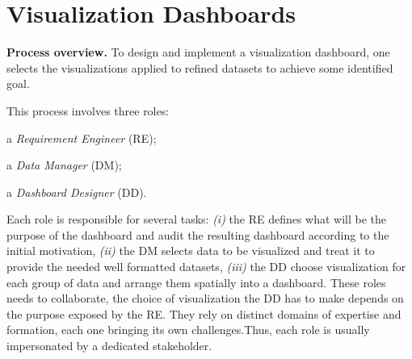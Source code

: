 \documentclass{sigplanconf}
\begin{document}

\section{Visualization Dashboards}
\textbf{Process overview.}
To design and implement a visualization dashboard, one selects the
visualizations applied to refined datasets to achieve some identified
goal. 

This process involves three roles: \begin{myenumerate}
\item a \emph{Requirement Engineer} (RE);
\item a \emph{Data Manager} (DM);
\item a \emph{Dashboard Designer} (DD).
\end{myenumerate}
Each role is responsible for several tasks: \emph{(i)} the RE defines what
will be the purpose of the dashboard and audit the resulting dashboard
according to the initial motivation, \emph{(ii)} the DM selects data to be
visualized and treat it to provide the needed well formatted
datasets, \emph{(iii)} the DD choose visualization for each group of data and
arrange them spatially into a dashboard.
These roles needs to collaborate, \eg the choice of visualization the
DD has to make depends on the purpose exposed by the RE. They rely
on distinct domains of expertise and formation, each one bringing its
own challenges.Thus, each role is usually impersonated by a
dedicated stakeholder.  
\end{document}
